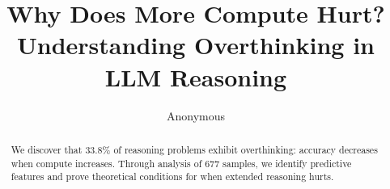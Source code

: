 \documentclass{article}
\title{Why Does More Compute Hurt? Understanding Overthinking in LLM Reasoning}
\author{Anonymous}
\begin{document}
\maketitle

\begin{abstract}
We discover that 33.8\% of reasoning problems exhibit overthinking: accuracy decreases when compute increases. Through analysis of 677 samples, we identify predictive features and prove theoretical conditions for when extended reasoning hurts.
\end{abstract}





\end{document}
